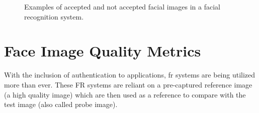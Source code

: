 \begin{figure}[h]
    
\caption{Examples of accepted and not accepted facial images in a facial recognition system.}
\label{fig:image_properties}

\end{figure}

\section{Face Image Quality Metrics} 
With the inclusion of authentication to applications, \acrlong{fr} systems are being utilized more than ever. These FR systems are reliant on a pre-captured reference image (a high quality image) which are then used as a reference to compare with the test image (also called probe image). 

